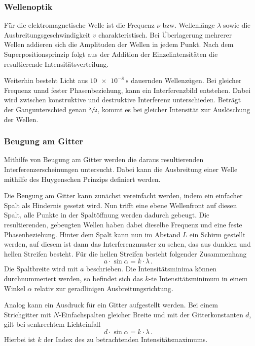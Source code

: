     \subsubsection*{Wellenoptik}
        Für die elektromagnetische Welle ist die Frequenz $\nu$ bzw. Wellenlänge $\lambda$ sowie die Ausbreitungsgeschwindigkeit $v$ charakteristisch.
        Bei Überlagerung mehrerer Wellen addieren sich die Amplituden der Wellen in jedem Punkt.
        Nach dem Superpositionsprinzip folgt aus der Addition der Einzelintensitäten die resultierende Intensitätsverteilung.

        \noindent
        Weiterhin besteht Licht aus $\SI{10e-8}{\second}$ dauernden Wellenzügen.
        Bei gleicher Frequenz unnd fester Phasenbeziehung, kann ein Interferenzbild entstehen.
        Dabei wird zwischen konstruktive und destruktive Interferenz unterschieden.
        Beträgt der Gangunterschied genau $\sfrac{\lambda}{2}$, kommt es bei gleicher Intensität zur Auslöschung der Wellen.

    \subsubsection*{Beugung am Gitter}
        Mithilfe von Beugung am Gitter werden die daraus resultierenden Interferenzerscheinungen untersucht.
        Dabei kann die Ausbreitung einer Welle mithilfe des Huygenschen Prinzips definiert werden.

        \noindent
        Die Beugung am Gitter kann zunächst vereinfacht werden, indem ein einfacher Spalt als Hindernis gesetzt wird.
        Nun trifft eine ebene Wellenfront auf diesen Spalt, alle Punkte in der Spaltöffnung werden dadurch gebeugt.
        Die resultierenden, gebeugten Wellen haben dabei dieselbe Frequenz und eine feste Phasenbeziehung.
        Hinter dem Spalt kann nun im Abstand $L$ ein Schirm gestellt werden, auf diesem ist dann das Interferenzmuster zu sehen, das aus dunklen und hellen Streifen besteht.
        Für die hellen Streifen besteht folgender Zusammenhang
        \begin{equation*}
            a \cdot \sin \alpha = k \cdot \lambda \, .
        \end{equation*}
        Die Spaltbreite wird mit $a$ beschrieben.
        Die Intensitätsminima können durchnummeriert werden, so befindet sich das $k$-te Intensitätsminimum in einem Winkel $\alpha$ relativ zur geradlinigen Ausbreitungsrichtung.

        \noindent
        Analog kann ein Ausdruck für ein Gitter aufgestellt werden.
        Bei einem Strichgitter mit $N$-Einfachspalten gleicher Breite und mit der Gitterkonstanten $d$, gilt bei senkrechtem Lichteinfall
        \begin{equation*}
            d \cdot \sin \alpha = k \cdot \lambda \, .
        \end{equation*}
        Hierbei ist $k$ der Index des zu betrachtenden Intensitätsmaximums.